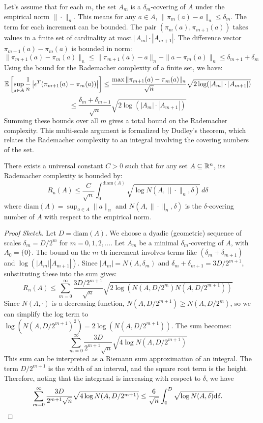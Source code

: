 Let's assume that for each $m$, the set $A_m$ is a $\delta_m$-covering of $A$ under the empirical norm $\| \cdot \|_n$. This means for any $a \in A$, $\|\pi_m(a) - a\|_n \le \delta_m$.
The term for each increment can be bounded. The pair $(\pi_m(a), \pi_{m+1}(a))$ takes values in a finite set of cardinality at most $|A_m| \cdot |A_{m+1}|$. The difference vector $\pi_{m+1}(a) - \pi_m(a)$ is bounded in norm:
$$ \|\pi_{m+1}(a) - \pi_m(a)\|_n \le \|\pi_{m+1}(a) - a\|_n + \|a - \pi_m(a)\|_n \le \delta_{m+1} + \delta_m $$
Using the bound for the Rademacher complexity of a finite set, we have:
$$ \mathbb{E}\left[\sup_{a \in A} \frac{1}{n} \left| \epsilon^T (\pi_{m+1}(a) - \pi_m(a)) \right| \right] \le \frac{\max \|\pi_{m+1}(a) - \pi_m(a)\|_n}{\sqrt{n}} \sqrt{2 \log(|A_m| \cdot |A_{m+1}|)} $$
$$ \le \frac{\delta_m + \delta_{m+1}}{\sqrt{n}} \sqrt{2 \log(|A_m| \cdot |A_{m+1}|)} $$
Summing these bounds over all $m$ gives a total bound on the Rademacher complexity. This multi-scale argument is formalized by Dudley's theorem, which relates the Rademacher complexity to an integral involving the covering numbers of the set.

\begin{thm}
There exists a universal constant $C > 0$ such that for any set $A \subseteq \mathbb{R}^n$, its Rademacher complexity is bounded by:
$$ R_n(A) \le \frac{C}{\sqrt{n}} \int_0^{\text{diam}(A)} \sqrt{\log N(A, \|\cdot\|_n, \delta)} \, d\delta $$
where $\text{diam}(A) = \sup_{a \in A} \|a\|_n$ and $N(A, \|\cdot\|_n, \delta)$ is the $\delta$-covering number of $A$ with respect to the empirical norm.
\end{thm}
\begin{proof}[Proof Sketch]
Let $D = \text{diam}(A)$. We choose a dyadic (geometric) sequence of scales $\delta_m = D/2^m$ for $m=0, 1, 2, \dots$. Let $A_m$ be a minimal $\delta_m$-covering of $A$, with $A_0=\{0\}$.
The bound on the $m$-th increment involves terms like $(\delta_m + \delta_{m+1})$ and $\log(|A_m||A_{m+1}|)$. Since $|A_m| = N(A, \delta_m)$ and $\delta_m + \delta_{m+1} = 3D/2^{m+1}$, substituting these into the sum gives:
$$ R_n(A) \le \sum_{m=0}^\infty \frac{3D/2^{m+1}}{\sqrt{n}} \sqrt{2\log(N(A, D/2^m)N(A, D/2^{m+1}))} $$
Since $N(A, \cdot)$ is a decreasing function, $N(A, D/2^{m+1}) \ge N(A, D/2^m)$, so we can simplify the log term to $\log(N(A, D/2^{m+1})^2) = 2\log(N(A, D/2^{m+1}))$. The sum becomes:
$$ \sum_{m=0}^\infty \frac{3D}{2^{m+1}\sqrt{n}} \sqrt{4\log N(A, D/2^{m+1})} $$
This sum can be interpreted as a Riemann sum approximation of an integral. The term $D/2^{m+1}$ is the width of an interval, and the square root term is the height. Therefore, noting that the integrand is increasing with respect to $\delta$, we have
\[
\sum_{m=0}^\infty \frac{3D}{2^{m+1}\sqrt{n}} \sqrt{4\log N(A, D/2^{m+1})}\le \frac{6}{\sqrt{n}} \int_0^D \sqrt{\log N(A, \delta)} \mathrm{d} \delta.
\]



\end{proof}

